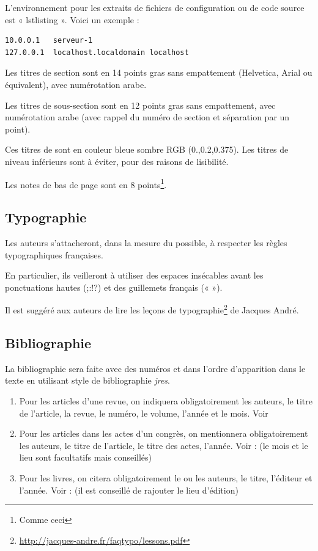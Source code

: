 \documentclass[city=Montpellier,year=2013]{jres}
\begin{document}
L'environnement pour les extraits de fichiers de configuration ou
de code source  est « lstlisting ». Voici un exemple :

\begin{lstlisting}
10.0.0.1   serveur-1
127.0.0.1  localhost.localdomain localhost
\end{lstlisting}

Les titres de section sont en 14 points gras sans empattement
(Helvetica, Arial ou équivalent), avec numérotation arabe.

Les titres de sous-section sont en 12 points gras sans empattement,
avec numérotation arabe (avec rappel du numéro de section et
séparation par un point).

Ces titres de sont en couleur bleue sombre RGB (0.,0.2,0.375).  Les
titres de niveau inférieurs sont à éviter, pour des raisons de
lisibilité.

Les notes de bas de page sont en 8 points\footnote{Comme ceci}.

\subsection{Typographie}

Les auteurs s'attacheront, dans la mesure du possible, à respecter les
règles typographiques françaises.

En particulier, ils veilleront à utiliser des espaces insécables avant
les ponctuations hautes (;:!?) et des guillemets français (« »).

Il est suggéré aux auteurs de lire les leçons de
typographie\footnote{\url{http://jacques-andre.fr/faqtypo/lessons.pdf}}
de Jacques André.

\subsection{Bibliographie}

La bibliographie sera faite avec des numéros et dans l'ordre
d'apparition dans le texte en utilisant style de bibliographie
\emph{jres}.

\begin{enumerate}

\item Pour les articles d'une revue, on indiquera obligatoirement les
  auteurs, le titre de l'article, la revue, le numéro, le volume,
  l'année et le mois. Voir \cite{exemple1}

\item Pour les articles dans les actes d'un congrès, on mentionnera
  obligatoirement les auteurs, le titre de l'article, le titre des
  actes, l'année. Voir : \cite{exemple2} (le mois et le lieu sont
  facultatifs mais conseillés)

\item Pour les livres, on citera obligatoirement le ou les auteurs, le
  titre, l'éditeur et l'année. Voir : \cite{exemple3} (il est conseillé de
  rajouter le lieu d'édition)

\end{enumerate}
\end{document}
